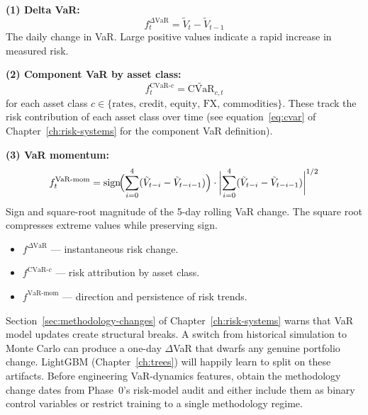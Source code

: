 \begin{definition}
\textbf{(1) Delta VaR:}
\begin{equation}
\label{eq:delta-var}
f^{\Delta\text{VaR}}_t = \tilde{V}_t - \tilde{V}_{t-1}
\end{equation}
The daily change in VaR.  Large positive values indicate a rapid
increase in measured risk.

\textbf{(2) Component VaR by asset class:}
\begin{equation}
\label{eq:cvar-ac}
f^{\text{CVaR-}c}_t = \widetilde{\text{CVaR}}_{c,t}
\end{equation}
for each asset class $c \in \{\text{rates, credit, equity, FX,
commodities}\}$.  These track the risk contribution of each asset class
over time (see equation~\eqref{eq:cvar} of Chapter~\ref{ch:risk-systems}
for the component VaR definition).

\textbf{(3) VaR momentum:}
\begin{equation}
\label{eq:var-mom}
f^{\text{VaR-mom}}_t = \operatorname{sign}\!\Bigl(
  \sum_{i=0}^{4} (\tilde{V}_{t-i} - \tilde{V}_{t-i-1})
\Bigr) \cdot
\biggl|\sum_{i=0}^{4} (\tilde{V}_{t-i} - \tilde{V}_{t-i-1})\biggr|^{1/2}
\end{equation}
Sign and square-root magnitude of the 5-day rolling VaR change.  The
square root compresses extreme values while preserving sign.

\begin{itemize}[nosep]
  \item $f^{\Delta\text{VaR}}$ --- instantaneous risk change.
  \item $f^{\text{CVaR-}c}$ --- risk attribution by asset class.
  \item $f^{\text{VaR-mom}}$ --- direction and persistence of risk
        trends.
\end{itemize}
\end{definition}

\begin{warning}
Section~\ref{sec:methodology-changes} of Chapter~\ref{ch:risk-systems}
warns that VaR model updates create structural breaks.  A switch from
historical simulation to Monte Carlo can produce a one-day $\Delta$VaR
that dwarfs any genuine portfolio change.  LightGBM
(Chapter~\ref{ch:trees}) will happily learn to split on these artifacts.
Before engineering VaR-dynamics features, obtain the methodology change
dates from Phase~0's risk-model audit and either include them as
binary control variables or restrict training to a single methodology
regime.
\end{warning}


